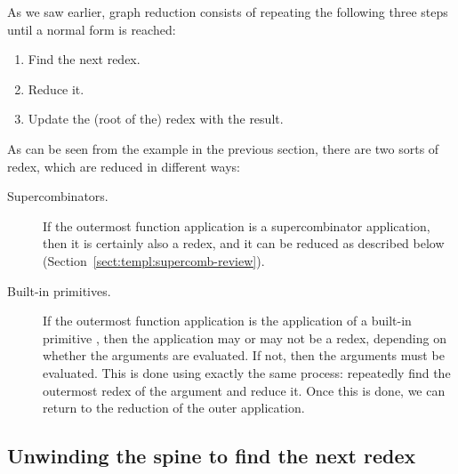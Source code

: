 As we saw earlier, graph reduction consists of repeating the following
three steps until a normal form is reached:
\begin{enumerate}
\item
Find the next redex.
\item
Reduce it.
\item
Update the (root of the) redex with the result.
\end{enumerate}
As can be seen from the example in the previous section,
there are two sorts of redex, which are
reduced in different ways:
\begin{description}
\item[Supercombinators.]
If the outermost function application is a supercombinator application,
then it is certainly also a redex, and it can be reduced as described
below (Section~\ref{sect:templ:supercomb-review}).
\item[Built-in primitives.]
If the outermost function application is the application of a built-in
primitive%
, then the application may or may not be a redex, depending on
whether the arguments are evaluated.
If not, then the arguments must be evaluated.
This is done using exactly the same process: repeatedly find the outermost
redex of the argument and reduce it.
Once this is done, we can return to the reduction of the outer application.
\end{description}

\subsection{Unwinding the spine to find the next redex}

